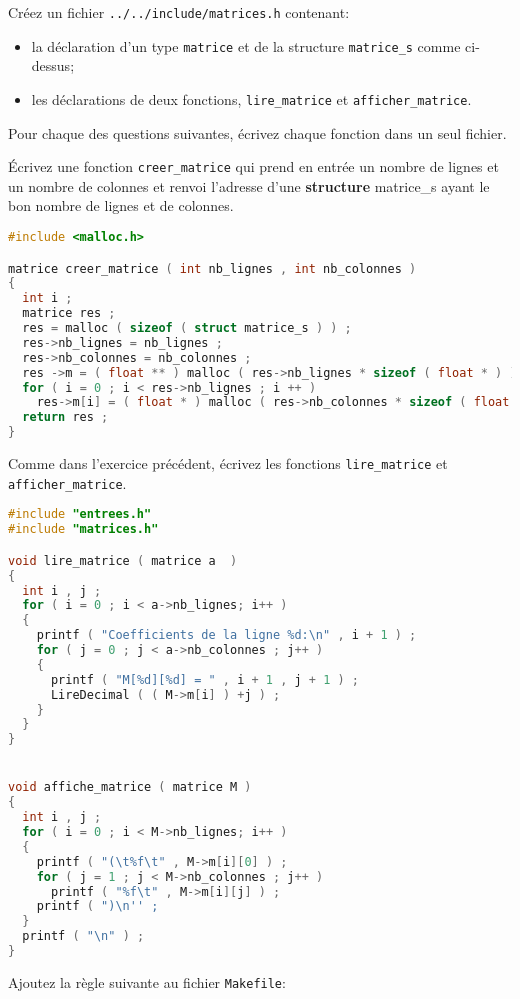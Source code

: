 \question Créez un fichier \texttt{../../include/matrices.h} contenant:
\begin{itemize}
\item la déclaration d'un type \texttt{matrice} et de la structure
  \texttt{matrice\_s} comme ci-dessus;
\item les déclarations de deux fonctions, \texttt{lire\_matrice} et
  \texttt{afficher\_matrice}.
\end{itemize}

\vspace*{1em}
Pour chaque des questions suivantes, écrivez chaque fonction dans un seul fichier.


\question Écrivez une fonction \texttt{creer\_matrice} qui prend en
entrée un nombre de lignes et un nombre de colonnes et renvoi
l'adresse d'une \textbf{structure} matrice\_s ayant le bon nombre de
lignes et de colonnes.


\begin{solution}
  \begin{lstlisting}[language=C]
#include <malloc.h>

matrice creer_matrice ( int nb_lignes , int nb_colonnes )
{
  int i ;
  matrice res ;
  res = malloc ( sizeof ( struct matrice_s ) ) ;
  res->nb_lignes = nb_lignes ;
  res->nb_colonnes = nb_colonnes ;
  res ->m = ( float ** ) malloc ( res->nb_lignes * sizeof ( float * ) ) ;
  for ( i = 0 ; i < res->nb_lignes ; i ++ )
    res->m[i] = ( float * ) malloc ( res->nb_colonnes * sizeof ( float ) ) ;
  return res ;
}
  \end{lstlisting}
\end{solution}

\question Comme dans l'exercice précédent, écrivez les fonctions \texttt{lire\_matrice} et
  \texttt{afficher\_matrice}.

\begin{solution}
  \begin{lstlisting}[language=C]
#include "entrees.h"
#include "matrices.h"

void lire_matrice ( matrice a  )
{
  int i , j ;
  for ( i = 0 ; i < a->nb_lignes; i++ )
  {
    printf ( "Coefficients de la ligne %d:\n" , i + 1 ) ;
    for ( j = 0 ; j < a->nb_colonnes ; j++ )
    {
      printf ( "M[%d][%d] = " , i + 1 , j + 1 ) ;
      LireDecimal ( ( M->m[i] ) +j ) ;
    }
  }
}


void affiche_matrice ( matrice M )
{
  int i , j ;
  for ( i = 0 ; i < M->nb_lignes; i++ )
  {
    printf ( "(\t%f\t" , M->m[i][0] ) ;
    for ( j = 1 ; j < M->nb_colonnes ; j++ )
      printf ( "%f\t" , M->m[i][j] ) ;
    printf ( ")\n'' ;
  }
  printf ( "\n" ) ;
}
  \end{lstlisting}
\end{solution}
\question Ajoutez la règle suivante au fichier \texttt{Makefile}:


